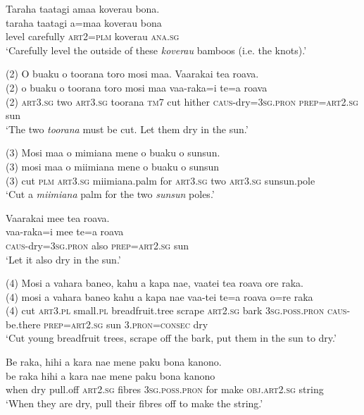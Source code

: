 \ea\label{ex:text22-20}
Taraha taatagi amaa koverau bona.\\
\gll taraha	taatagi	a=maa	koverau	bona\\
     level	carefully	\textsc{art}2=\textsc{plm}	koverau	\textsc{ana}.\textsc{sg}\\
\glt `Carefully level the outside of these \textit{koverau} bamboos (i.e. the knots).'
\z

\ea\label{ex:text22-21}
(2) O buaku o toorana toro mosi maa. Vaarakai tea roava.\\
\gll (2)	o	buaku	o	toorana	toro	mosi	maa	vaa-raka=i	te=a	roava\\
     (2)	\textsc{art}3.\textsc{sg}	two	\textsc{art}3.\textsc{sg}	toorana	\textsc{tm}7	cut	hither	\textsc{caus}-dry=3\textsc{sg}.\textsc{pron}	\textsc{prep}=\textsc{art}2.\textsc{sg}	sun\\
\glt `The two \textit{toorana} must be cut. Let them dry in the sun.'
\z

\ea\label{ex:text22-22}
(3) Mosi maa o mimiana mene o buaku o sunsun.\\
\gll (3)	mosi	maa	o	miimiana	mene	o	buaku	o	sunsun\\
     (3)	cut	\textsc{plm}	\textsc{art}3.\textsc{sg}	miimiana.palm	for	\textsc{art}3.\textsc{sg}	two	\textsc{art}3.\textsc{sg}	sunsun.pole\\
\glt `Cut a \textit{miimiana} palm for the two \textit{sunsun} poles.'
\z

\ea\label{ex:text22-23}
Vaarakai mee tea roava.\\
\gll vaa-raka=i	mee	te=a	roava\\
     \textsc{caus}-dry=3\textsc{sg}.\textsc{pron}	also	\textsc{prep}=\textsc{art}2.\textsc{sg}	sun\\
\glt `Let it also dry in the sun.'
\z

\ea\label{ex:text22-24}
(4) Mosi a vahara baneo, kahu a kapa nae, vaatei tea roava ore raka.\\
\gll (4)	mosi	a	vahara	baneo	kahu	a	kapa	nae	vaa-tei	te=a	roava	o=re	raka\\
     (4)	cut	\textsc{art}3.\textsc{pl}	small.\textsc{pl}	breadfruit.tree	scrape	\textsc{art}2.\textsc{sg}	bark	3\textsc{sg}.\textsc{poss}.\textsc{pron}	\textsc{caus}-be.there	\textsc{prep}=\textsc{art}2.\textsc{sg}	sun	3.\textsc{pron}=\textsc{consec}	dry\\
\glt `Cut young breadfruit trees, scrape off the bark, put them in the sun to dry.'
\z

\ea\label{ex:text22-25}
Be raka, hihi a kara nae mene paku bona kanono.\\
\gll be	raka	hihi	a	kara	nae	mene	paku	bona	kanono\\
     when	dry	pull.off	\textsc{art}2.\textsc{sg}	fibres	3\textsc{sg}.\textsc{poss}.\textsc{pron}	for	make	\textsc{obj}.\textsc{art}2.\textsc{sg}	string\\
\glt `When they are dry, pull their fibres off to make the string.'
\z

